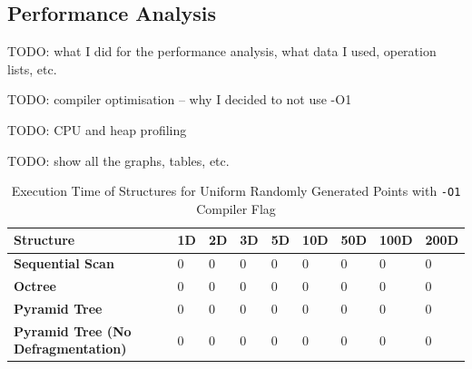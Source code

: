 \subsection{Performance Analysis}

TODO: what I did for the performance analysis, what data I used, operation lists, etc.

TODO: compiler optimisation -- why I decided to not use -O1 

TODO: CPU and heap profiling

TODO: show all the graphs, tables, etc.

\begin{table}
	\centering
	\begin{tabular}{|l|l|l|l|l|l|l|l|l|}
		\hline
		\textbf{Structure} & \textbf{1D} & \textbf{2D} & \textbf{3D} & \textbf{5D} & \textbf{10D} & \textbf{50D} & \textbf{100D} & \textbf{200D} \\
		\hline
		\textbf{Sequential Scan} & 0 & 0 & 0 & 0 & 0 & 0 & 0 & 0 \\
		\textbf{Octree} & 0 & 0 & 0 & 0 & 0 & 0 & 0 & 0 \\
		\textbf{Pyramid Tree} & 0 & 0 & 0 & 0 & 0 & 0 & 0 & 0 \\
		\textbf{Pyramid Tree (No Defragmentation)} & 0 & 0 & 0 & 0 & 0 & 0 & 0 & 0 \\
		\hline
	\end{tabular}
	\caption{Execution Time of Structures for Uniform Randomly Generated Points with \texttt{-O1} Compiler Flag}
	\label{tab:perf1-randuniform-o1}
\end{table}

